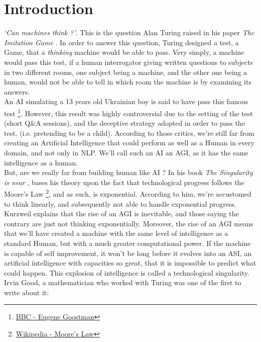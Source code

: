 \documentclass[12pt]{article}
\begin{document}
\section*{Introduction}\label{introduction}

\smallskip

{\em \lq Can machines think ?\rq }. This is the question Alan Turing raised in
his paper {\em The Imitation Game} \cite{Turing}. In order to answer this
question, Turing designed a test, a Game, that a {\em thinking} machine would be
able to pass. Very simply, a machine would pass this test, if a human
interrogator giving written questions to subjects in two different rooms, one
subject being a machine, and the other one being a human, would not be able to
tell in which room the machine is by examining its answers. \\

An AI simulating a 13 years old Ukrainian boy is said to have pass this famous
test \footnote{\href{http://www.bbc.com/news/technology-27762088} {BBC - Eugene
Goostman}}. However, this result was highly controversial due to the setting of
the test (short Q\&A sessions), and the deceptive strategy adopted in order to
pass the test. (i.e. pretending to be a child). According to those critics,
we're still far from creating an Artificial Intelligence that could perform as
well as a Human in every domain, and not only in \gls{NLP}. We'll call such an
AI an \gls{AGI}, as it has the same intelligence as a human. \\

But, are we really far from building human like AI ? In his book {\em The
Singularity is near} \cite{Kurzweil}, bases his theory upon the fact that
technological progress follows the Moore's Law
\footnote{\href{https://en.wikipedia.org/wiki/Moore\%27s_law} {Wikipedia -
Moore's Law} }, and as such, is exponential. According to him, we're accustomed
to think linearly, and subsequently not able to handle exponential progress.
Kurzweil explains that the rise of an \gls{AGI} is inevitable, and those saying
the contrary are just not thinking exponentially. Moreover, the rise of an
\gls{AGI} means that we'll have created a machine with the same level of
intelligence as a standard Human, but with a much greater computational power.
If the machine is capable of self improvement, it won't be long before it
evolves into an \gls{ASI}, an artificial intelligence with capacities so great,
that it is impossible to predict what could happen. This explosion of
intelligence is called a technological singularity. Irvin Good, a mathematician
who worked with Turing was one of the first to write about it: \\
\end{document}

